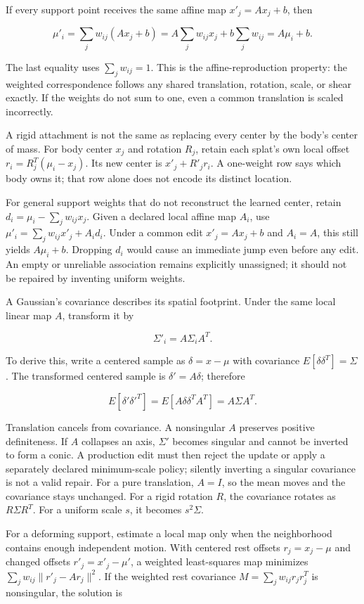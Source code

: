 If every support point receives the same affine map \(x'_j=Ax_j+b\), then

\[
\mu'_i=\sum_jw_{ij}(Ax_j+b)
=A\sum_jw_{ij}x_j+b\sum_jw_{ij}
=A\mu_i+b.
\]

The last equality uses \(\sum_jw_{ij}=1\). This is the affine-reproduction property: the weighted correspondence follows any shared translation, rotation, scale, or shear exactly. If the weights do not sum to one, even a common translation is scaled incorrectly.

A rigid attachment is not the same as replacing every center by the body's center of mass. For body center \(x_j\) and rotation \(R_j\), retain each splat's own local offset \(r_i=R_j^T(\mu_i-x_j)\). Its new center is \(x'_j+R'_jr_i\). A one-weight row says which body owns it; that row alone does not encode its distinct location.

For general support weights that do not reconstruct the learned center, retain \(d_i=\mu_i-\sum_jw_{ij}x_j\). Given a declared local affine map \(A_i\), use \(\mu'_i=\sum_jw_{ij}x'_j+A_id_i\). Under a common edit \(x'_j=Ax_j+b\) and \(A_i=A\), this still yields \(A\mu_i+b\). Dropping \(d_i\) would cause an immediate jump even before any edit. An empty or unreliable association remains explicitly unassigned; it should not be repaired by inventing uniform weights.

A Gaussian's covariance describes its spatial footprint. Under the same local linear map \(A\), transform it by

\[
\Sigma'_i=A\Sigma_iA^T.
\]

To derive this, write a centered sample as \(\delta=x-\mu\) with covariance \(E[\delta\delta^T]=\Sigma\). The transformed centered sample is \(\delta'=A\delta\); therefore

\[
E[\delta'\delta'^T]=E[A\delta\delta^TA^T]=A\Sigma A^T.
\]

Translation cancels from covariance. A nonsingular \(A\) preserves positive definiteness. If \(A\) collapses an axis, \(\Sigma'\) becomes singular and cannot be inverted to form a conic. A production edit must then reject the update or apply a separately declared minimum-scale policy; silently inverting a singular covariance is not a valid repair. For a pure translation, \(A=I\), so the mean moves and the covariance stays unchanged. For a rigid rotation \(R\), the covariance rotates as \(R\Sigma R^T\). For a uniform scale \(s\), it becomes \(s^2\Sigma\).

For a deforming support, estimate a local map only when the neighborhood contains enough independent motion. With centered rest offsets \(r_j=x_j-\mu\) and changed offsets \(r'_j=x'_j-\mu'\), a weighted least-squares map minimizes \(\sum_jw_{ij}\|r'_j-Ar_j\|^2\). If the weighted rest covariance \(M=\sum_jw_{ij}r_jr_j^T\) is nonsingular, the solution is

